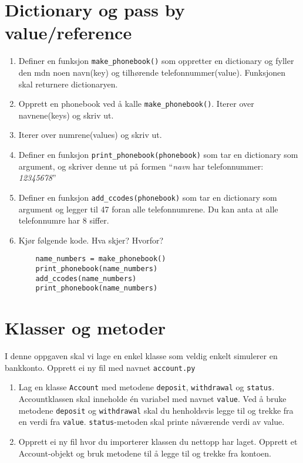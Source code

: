 \documentclass[12pt, norsk, a4paper]{exam}
\begin{document}
\section{Dictionary og pass by value/reference}
\begin{enumerate} 

\item
Definer en funksjon \texttt{make\_phonebook()} som oppretter en dictionary og
fyller den mdn noen navn(key) og tilhørende telefonnummer(value). Funksjonen
skal returnere dictionaryen. 
\item Opprett en phonebook ved å kalle \texttt{make\_phonebook()}.  Iterer over
navnene(keys) og skriv ut. 
\item Iterer over numrene(values) og skriv ut. 
\item Definer en funksjon \texttt{print\_phonebook(phonebook)} som tar en
dictionary som argument, og skriver denne ut på formen ``\emph{navn} har
telefonnummer: \emph{12345678}''
\item Definer en funksjon \texttt{add\_ccodes(phonebook)} som tar en dictionary
som argument og legger til 47 foran alle telefonnumrene. Du kan anta at alle telefonnumre har 8 siffer. 
\item Kjør følgende kode. Hva skjer?  Hvorfor? 
\begin{verbatim}
    name_numbers = make_phonebook()
    print_phonebook(name_numbers)
    add_ccodes(name_numbers)
    print_phonebook(name_numbers)
\end{verbatim}
\end{enumerate}

\section{Klasser og metoder}
 I denne oppgaven skal vi lage en enkel
klasse som veldig enkelt simulerer en bankkonto. Opprett ei ny fil med navnet
\texttt{account.py}

\begin{enumerate}
\item Lag en klasse \texttt{Account} med metodene \texttt{deposit},
\texttt{withdrawal} og \texttt{status}. Accountklassen skal inneholde én variabel med navnet
\texttt{value}. Ved å bruke metodene \texttt{deposit} og \texttt{withdrawal} skal du henholdsvis
legge til og trekke fra en verdi fra \texttt{value}. \texttt{status}-metoden skal printe
nåværende verdi av value. 
\item Opprett ei ny fil hvor du importerer klassen du
nettopp har laget. Opprett et Account-objekt og bruk metodene til å legge til og
trekke fra kontoen. 
\end{enumerate}
\end{document}

